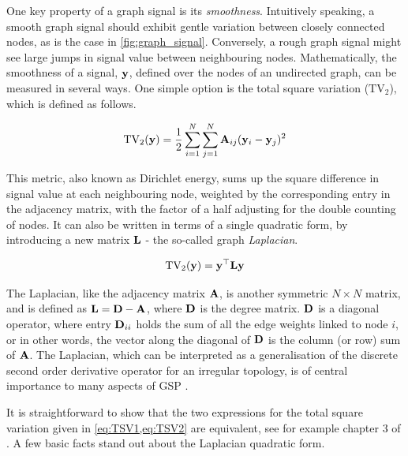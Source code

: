 One key property of a graph signal is its \textit{smoothness}. Intuitively speaking, a smooth graph signal should exhibit gentle variation between closely connected nodes, as is the case in \cref{fig:graph_signal}. Conversely, a rough graph signal might see large jumps in signal value between neighbouring nodes. Mathematically, the smoothness of a signal, $\mathbf{y}$, defined over the nodes of an undirected graph, can be measured in several ways. One simple option is the total square variation ($\text{TV}_2$), which is defined as follows. 

\begin{equation}
    \label{eq:TSV1}
    \text{TV}_2(\mathbf{y}) = \frac{1}{2}\sum_{i=1}^N \sum_{j=1}^N \mathbf{A}_{ij} (\mathbf{y}_i - \mathbf{y}_j)^2
\end{equation}

This metric, also known as Dirichlet energy, sums up the square difference in signal value at each neighbouring node, weighted by the corresponding entry in the adjacency matrix, with the factor of a half adjusting for the double counting of nodes. It can also be written in terms of a single quadratic form, by introducing a new matrix $\mathbf{L}$ - the so-called graph \textit{Laplacian}. 

\begin{equation}
    \label{eq:TSV2}
    \text{TV}_2(\mathbf{y}) = \mathbf{y}^\top \mathbf{L} \mathbf{y}
\end{equation}

The Laplacian, like the adjacency matrix $\mathbf{A}$, is another symmetric $N \times N$ matrix, and is defined as $\mathbf{L} = \mathbf{D} - \mathbf{A}$, where $\mathbf{D}$ is the degree matrix. $\mathbf{D}$ is a diagonal operator, where entry $\mathbf{D}_{ii}$ holds the sum of all the edge weights linked to node $i$, or in other words, the vector along the diagonal of $\mathbf{D}$ is the column (or row) sum of $\mathbf{A}$. The Laplacian, which can be interpreted as a generalisation of the discrete second order derivative operator for an irregular topology, is of central importance to many aspects of GSP \citep{Shuman2013}. 

\newpage

It is straightforward to show that the two expressions for the total square variation given in \cref{eq:TSV1,eq:TSV2} are equivalent, see for example chapter 3 of \cite{Ortega2022}. A few basic facts stand out about the Laplacian quadratic form.

